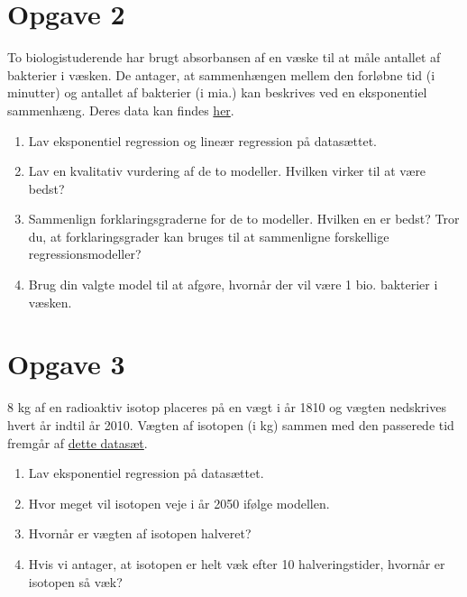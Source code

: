 \documentclass[12pt]{article}
\begin{document}
\section*{Opgave 2}
To biologistuderende har brugt absorbansen af en væske til at måle antallet af bakterier i væsken. De antager, at sammenhængen mellem den forløbne tid (i minutter) og antallet af bakterier (i mia.) kan beskrives ved en eksponentiel sammenhæng. Deres data kan findes \href{}{\color{blue!60} her}.

\begin{enumerate}[label=\roman*)]
	\item Lav eksponentiel regression og lineær regression på datasættet.
	\item Lav en kvalitativ vurdering af de to modeller. Hvilken virker til at være bedst?
	\item Sammenlign forklaringsgraderne for de to modeller. Hvilken en er bedst? Tror du, at forklaringsgrader kan bruges til at sammenligne forskellige regressionsmodeller?
	\item Brug din valgte model til at afgøre, hvornår der vil være 1 bio. bakterier i væsken. 
\end{enumerate}

\section*{Opgave 3}
8 kg af en radioaktiv isotop placeres på en vægt i år 1810 og vægten nedskrives hvert år indtil år 2010. Vægten af isotopen (i kg) sammen med den passerede tid fremgår af \href{}{\color{blue!60} dette datasæt}.

\begin{enumerate}[label=\roman*)]
	\item Lav eksponentiel regression på datasættet.
	\item Hvor meget vil isotopen veje i år 2050 ifølge modellen.
	\item Hvornår er vægten af isotopen halveret?
	\item Hvis vi antager, at isotopen er helt væk efter 10 halveringstider, hvornår er isotopen så væk?
\end{enumerate}
\end{document}
